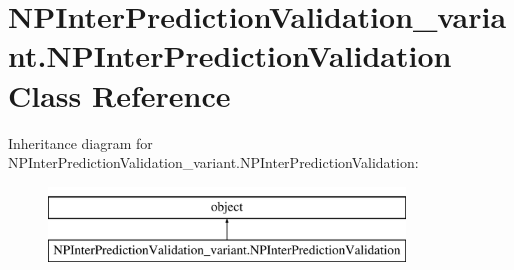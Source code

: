 \hypertarget{classNPInterPredictionValidation__variant_1_1NPInterPredictionValidation}{\section{N\-P\-Inter\-Prediction\-Validation\-\_\-variant.\-N\-P\-Inter\-Prediction\-Validation Class Reference}
\label{classNPInterPredictionValidation__variant_1_1NPInterPredictionValidation}
}
Inheritance diagram for N\-P\-Inter\-Prediction\-Validation\-\_\-variant.\-N\-P\-Inter\-Prediction\-Validation\-:\begin{figure}[H]
\begin{center}
\leavevmode
\includegraphics[height=2.000000cm]{classNPInterPredictionValidation__variant_1_1NPInterPredictionValidation}
\end{center}
\end{figure}
